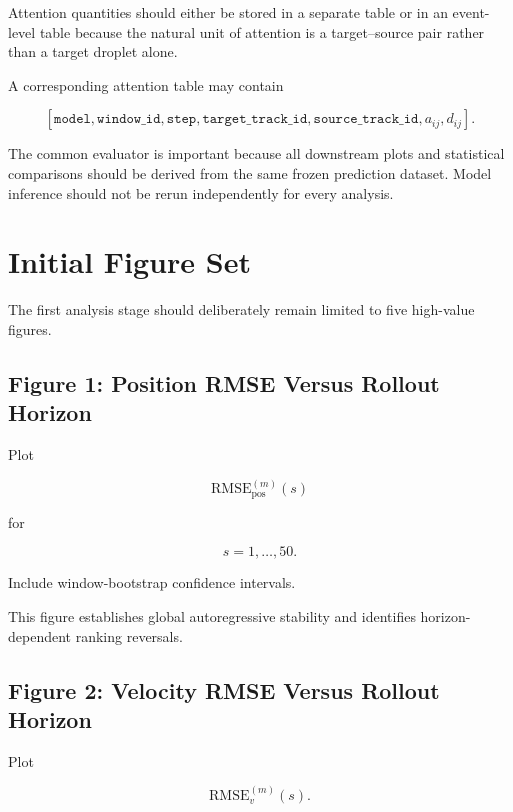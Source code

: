 \documentclass[11pt]{article}
\begin{document}
Attention quantities should either be stored in a separate table or in an event-level table because the natural unit of attention is a target--source pair rather than a target droplet alone.

A corresponding attention table may contain

\begin{equation}
\left[
\texttt{model},
\texttt{window\_id},
\texttt{step},
\texttt{target\_track\_id},
\texttt{source\_track\_id},
a_{ij},
d_{ij}
\right].
\end{equation}

The common evaluator is important because all downstream plots and statistical comparisons should be derived from the same frozen prediction dataset. Model inference should not be rerun independently for every analysis.

\section{Initial Figure Set}

The first analysis stage should deliberately remain limited to five high-value figures.

\subsection{Figure 1: Position RMSE Versus Rollout Horizon}

Plot

\begin{equation}
\mathrm{RMSE}_{\mathrm{pos}}^{(m)}(s)
\end{equation}

for

\begin{equation}
s=1,\ldots,50.
\end{equation}

Include window-bootstrap confidence intervals.

This figure establishes global autoregressive stability and identifies horizon-dependent ranking reversals.

\subsection{Figure 2: Velocity RMSE Versus Rollout Horizon}

Plot

\begin{equation}
\mathrm{RMSE}_{v}^{(m)}(s).
\end{equation}
\end{document}
